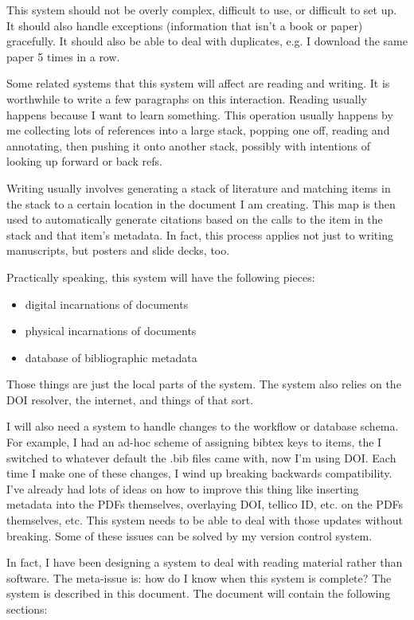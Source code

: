 \documentclass[letterpaper,12pt]{article}
\begin{document}
This system should not be overly complex, difficult to use, or difficult to set up. It should also handle exceptions (information that isn't a book or paper) gracefully. It should also be able to deal with duplicates, e.g. I download the same paper 5 times in a row.

Some related systems that this system will affect are reading and writing. It is worthwhile to write a few paragraphs on this interaction. Reading usually happens because I want to learn something. This operation usually happens by me collecting lots of references into a large stack, popping one off, reading and annotating, then pushing it onto another stack, possibly with intentions of looking up forward or back refs.

Writing usually involves generating a stack of literature and matching items in the stack to a certain location in the document I am creating. This map is then used to automatically generate citations based on the calls to the item in the stack and that item's metadata. In fact, this process applies not just to writing manuscripts, but posters and slide decks, too.

Practically speaking, this system will have the following pieces:

\begin{itemize}
\item digital incarnations of documents
\item physical incarnations of documents
\item database of bibliographic metadata
\end{itemize}

Those things are just the local parts of the system. The system also relies on the DOI resolver, the internet, and things of that sort.

I will also need a system to handle changes to the workflow or database schema. For example, I had an ad-hoc scheme of assigning bibtex keys to items, the I switched to whatever default the .bib files came with, now I'm using DOI. Each time I make one of these changes, I wind up breaking backwards compatibility. I've already had lots of ideas on how to improve this thing like inserting metadata into the PDFs themselves, overlaying DOI, tellico ID, etc. on the PDFs themselves, etc. This system needs to be able to deal with those updates without breaking. Some of these issues can be solved by my version control system.

In fact, I have been designing a system to deal with reading material rather than software. The meta-issue is: how do I know when this system is complete? The system is described in this document. The document will contain the following sections:
\end{document}
